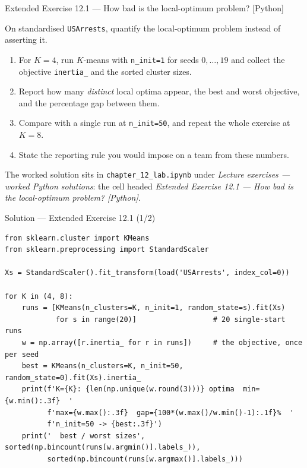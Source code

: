 \documentclass[aspectratio=169,11pt]{beamer}
\begin{document}
\begin{frame}{Extended Exercise 12.1 --- How bad is the local-optimum problem? [Python]}
\begin{longexercise}
  On standardised \texttt{USArrests}, quantify the local-optimum problem instead of
  asserting it.
  \begin{enumerate}
    \item For $K=4$, run $K$-means with \texttt{n\_init=1} for seeds $0,\dots,19$ and
          collect the objective \texttt{inertia\_} and the sorted cluster sizes.
    \item Report how many \emph{distinct} local optima appear, the best and worst
          objective, and the percentage gap between them.
    \item Compare with a single run at \texttt{n\_init=50}, and repeat the whole exercise
          at $K=8$.
    \item State the reporting rule you would impose on a team from these numbers.
  \end{enumerate}
\end{longexercise}
\begin{labnote}
  The worked solution sits in \texttt{chapter\_12\_lab.ipynb} under
  \emph{Lecture exercises --- worked Python solutions}: the cell headed
  \emph{Extended Exercise 12.1 --- How bad is the local-optimum problem? [Python]}.
\end{labnote}
\end{frame}

\begin{frame}[fragile]{Solution --- Extended Exercise 12.1 (1/2)}
\begin{solutionbox}
\begin{lstlisting}[basicstyle=\ttfamily\scriptsize]
from sklearn.cluster import KMeans
from sklearn.preprocessing import StandardScaler

Xs = StandardScaler().fit_transform(load('USArrests', index_col=0))

for K in (4, 8):
    runs = [KMeans(n_clusters=K, n_init=1, random_state=s).fit(Xs)
            for s in range(20)]                  # 20 single-start runs
    w = np.array([r.inertia_ for r in runs])     # the objective, once per seed
    best = KMeans(n_clusters=K, n_init=50, random_state=0).fit(Xs).inertia_
    print(f'K={K}: {len(np.unique(w.round(3)))} optima  min={w.min():.3f}  '
          f'max={w.max():.3f}  gap={100*(w.max()/w.min()-1):.1f}%  '
          f'n_init=50 -> {best:.3f}')
    print('  best / worst sizes', sorted(np.bincount(runs[w.argmin()].labels_)),
          sorted(np.bincount(runs[w.argmax()].labels_)))
\end{lstlisting}
\end{solutionbox}
\end{frame}
\end{document}

